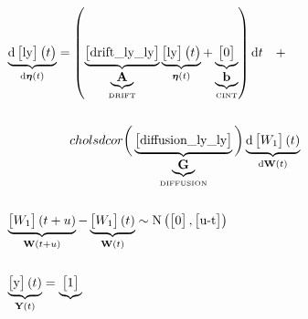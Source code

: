 \documentclass[a4paper,landscape]{report}
\newcommand{\vect}[1]{\boldsymbol{\mathbf{#1}}}
\begin{document}
\thispagestyle{empty}
\setcounter{MaxMatrixCols}{200}
 \begin{footnotesize}
  \begin{align*}
  &\underbrace{\mathrm{d}
    \begin{bmatrix}
\text{ly}
\end{bmatrix} 
    \big{(}t\big{)}}_{\mathrm{d} \vect{\eta} (t)}	=  \left(
      \underbrace{
        \begin{bmatrix}
\text{drift\_ly\_ly}
\end{bmatrix}
      }_{\underbrace{\vect{A}}_\textrm{DRIFT}} \underbrace{
        \begin{bmatrix}
\text{ly}
\end{bmatrix} 
        \big{(}t\big{)}
      }_{\vect{\eta} (t)}	+ \underbrace{
        \begin{bmatrix}
0
\end{bmatrix}
      }_{\underbrace{\vect{b}}_\textrm{CINT}}\right) \mathrm{d}t \quad + \nonumber \\ \\
    & \qquad \qquad \quad cholsdcor\bigg(\underbrace{
      \begin{bmatrix}
\text{diffusion\_ly\_ly}
\end{bmatrix}
    }_{\underbrace{\vect{G}}_\textrm{DIFFUSION}}\bigg)
    \underbrace{\mathrm{d}
      \begin{bmatrix}
W_{1}
\end{bmatrix} 
      (t)}_{\mathrm{d} \vect{W}(t)} \\ \\
          &\underbrace{
            \begin{bmatrix}
W_{1}
\end{bmatrix}  
            (t+u)}_{\vect{W}(t+u)} -   \underbrace{\begin{bmatrix}
W_{1}
\end{bmatrix}  
            (t)}_{\vect{W}(t)} \sim  \mathrm{N} \left(
              \begin{bmatrix}
0
\end{bmatrix}, \begin{bmatrix}
\text{u-t}
\end{bmatrix} \right) \\ \\
&\underbrace{
      \begin{bmatrix}
\text{y}
\end{bmatrix}  
      (t)}_{\vect{Y}(t)} = 
        \underbrace{
          \begin{bmatrix}
1
\end{bmatrix} 
}
\end{align*}
\end{footnotesize}
\end{document}

